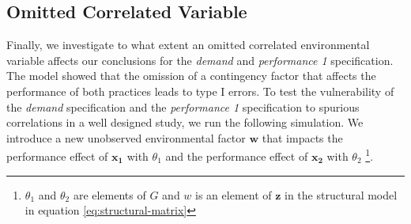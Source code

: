 \documentclass[12pt]{article}
\begin{document}
% 
% 

\subsection{Omitted Correlated Variable}

Finally, we investigate to what extent an omitted correlated environmental variable affects our conclusions for the \emph{demand} and \emph{performance 1} specification. The model showed that the omission of a contingency factor that affects the performance of both practices leads to type I errors. To test the vulnerability of the \emph{demand} specification and the \emph{performance 1} specification to spurious correlations in a well designed study, we run the following simulation. We introduce a new unobserved environmental factor \(\mathbf{w}\) that impacts the performance effect of \(\mathbf{x_1}\) with \(\theta_1\) and the performance effect of \(\mathbf{x_2}\) with \(\theta_2\) \footnote{$\theta_1$ and $\theta_2$ are elements of $G$ and $w$ is an element of $\mathbf{z}$ in the structural model in equation \ref{eq:structural-matrix}}. 
\end{document}
